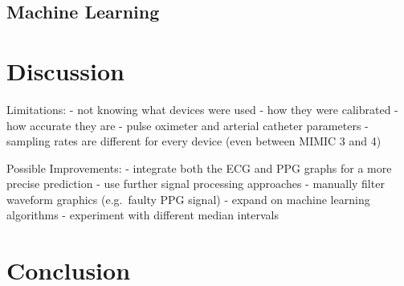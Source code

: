 \documentclass[12pt, bibliography=totoc]{scrartcl}
\begin{document}
    \subsection{Machine Learning}
    \label{subsec:machine_learning}


    \section{Discussion}
    \label{sec:discussion}

    Limitations:
    - not knowing what devices were used
    - how they were calibrated
    - how accurate they are
    - pulse oximeter and arterial catheter parameters
    - sampling rates are different for every device (even between MIMIC 3 and 4)

    Possible Improvements:
    - integrate both the ECG and PPG graphs for a more precise prediction
    - use further signal processing approaches
    - manually filter waveform graphics (e.g.\ faulty PPG signal)
    - expand on machine learning algorithms
    - experiment with different median intervals


    \section{Conclusion}
    \label{sec:conclusion}

    \newpage

    
    
\end{document}
